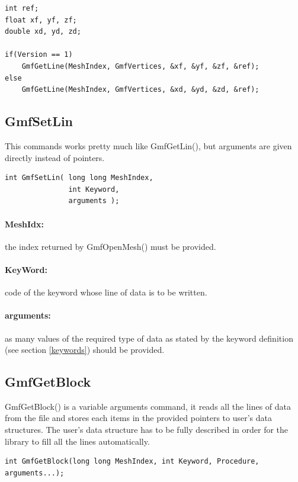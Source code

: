 \documentclass[a4paper,12pt]{article}
\begin{document}
\begin{tt}
\begin{verbatim}
int ref;
float xf, yf, zf;
double xd, yd, zd;

if(Version == 1)
    GmfGetLine(MeshIndex, GmfVertices, &xf, &yf, &zf, &ref);
else
    GmfGetLine(MeshIndex, GmfVertices, &xd, &yd, &zd, &ref);
\end{verbatim}
\end{tt}
\normalfont


\subsection{GmfSetLin}
This commands works pretty much like GmfGetLin(), but arguments are given directly instead of pointers.

\begin{tt}
\begin{verbatim}
int GmfSetLin( long long MeshIndex,
               int Keyword,
               arguments );
\end{verbatim}
\end{tt}
\normalfont

\paragraph{MeshIdx:}
the index returned by GmfOpenMesh() must be provided.

\paragraph{KeyWord:} code of the keyword whose line of data is to be written.

\paragraph{arguments:} as many values of the required type of data as stated by the keyword definition (see section \ref{keywords}) should be provided.


\subsection{GmfGetBlock}
GmfGetBlock() is a variable arguments command, it reads all the lines of data from the file and stores each items in the provided pointers to user's data structures. The user's data structure has to be fully described in order for the library to fill all the lines automatically.

\begin{tt}
\begin{verbatim}
int GmfGetBlock(long long MeshIndex, int Keyword, Procedure, arguments...);
\end{verbatim}
\end{tt}
\normalfont
\end{document}
